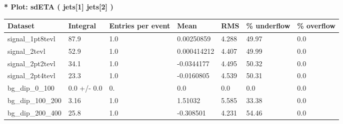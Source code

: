 \documentclass[a4paper, 10pt]{article}
\begin{document}
\textbf{* Plot: sdETA ( jets[1] jets[2] ) }\\
   \begin{table}[H]
  \begin{center}
    \begin{tabular}{|m{23.0mm}|m{23.0mm}|m{18.0mm}|m{19.0mm}|m{19.0mm}|m{19.0mm}|m{19.0mm}|}
      \hline
      {\cellcolor{yellow}         Dataset}& {\cellcolor{yellow}         Integral}& {\cellcolor{yellow}         Entries per event}& {\cellcolor{yellow}         Mean}& {\cellcolor{yellow}         RMS}& {\cellcolor{yellow}         \% underflow}& {\cellcolor{yellow}         \% overflow}\\
      \hline
      {\cellcolor{white}         signal\_1pt8tevl}& {\cellcolor{white}         87.9}& {\cellcolor{white}         1.0}& {\cellcolor{white}         0.00250859}& {\cellcolor{white}         4.288}& {\cellcolor{red}         49.97}& {\cellcolor{red}         0.0}\\
      \hline
      {\cellcolor{white}         signal\_2tevl}& {\cellcolor{white}         52.9}& {\cellcolor{white}         1.0}& {\cellcolor{white}         0.000414212}& {\cellcolor{white}         4.407}& {\cellcolor{red}         49.99}& {\cellcolor{red}         0.0}\\
      \hline
      {\cellcolor{white}         signal\_2pt2tevl}& {\cellcolor{white}         34.1}& {\cellcolor{white}         1.0}& {\cellcolor{white}         -0.0344177}& {\cellcolor{white}         4.495}& {\cellcolor{red}         50.32}& {\cellcolor{red}         0.0}\\
      \hline
      {\cellcolor{white}         signal\_2pt4tevl}& {\cellcolor{white}         23.3}& {\cellcolor{white}         1.0}& {\cellcolor{white}         -0.0160805}& {\cellcolor{white}         4.539}& {\cellcolor{red}         50.31}& {\cellcolor{red}         0.0}\\
      \hline
      {\cellcolor{white}         bg\_dip\_0\_100}& {\cellcolor{white}         0.0 +/\-- 0.0}& {\cellcolor{white}         0.}& {\cellcolor{white}         0.0}& {\cellcolor{white}         0.0}& {\cellcolor{green}         0.0}& {\cellcolor{green}         0.0}\\
      \hline
      {\cellcolor{white}         bg\_dip\_100\_200}& {\cellcolor{white}         3.16}& {\cellcolor{white}         1.0}& {\cellcolor{white}         1.51032}& {\cellcolor{white}         5.585}& {\cellcolor{red}         33.38}& {\cellcolor{red}         0.0}\\
      \hline
      {\cellcolor{white}         bg\_dip\_200\_400}& {\cellcolor{white}         25.8}& {\cellcolor{white}         1.0}& {\cellcolor{white}         -0.308501}& {\cellcolor{white}         4.231}& {\cellcolor{red}         54.46}& {\cellcolor{red}         0.0}\\

\end{tabular}
\end{center}
\end{table}
\end{document}
